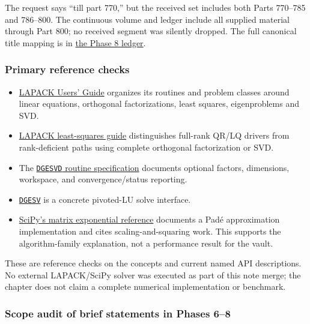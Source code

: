 The request says ``till part 770,'' but the received set includes both Parts 770--785 and 786--800. The continuous volume and ledger include all supplied material through Part 800; no received segment was silently dropped. The full canonical title mapping is in \hyperref[appendix-fd090d982a15-phase-8---parts-701-800]{the Phase 8 ledger}.

\subsubsection{Primary reference checks}\label{appendix-a103e7846d21-primary-reference-checks}

\begin{itemize}
\tightlist
\item
  \href{https://netlib.org/lapack/lug/index.html}{LAPACK Users' Guide} organizes its routines and problem classes around linear equations, orthogonal factorizations, least squares, eigenproblems and SVD.
\item
  \href{https://www.netlib.org/lapack/lug/node27.html}{LAPACK least-squares guide} distinguishes full-rank QR/LQ drivers from rank-deficient paths using complete orthogonal factorization or SVD.
\item
  The \href{https://netlib.org/lapack/explore-html/d1/d7f/group__gesvd_gac6bd5d4e645049e49bb70691180abf07.html}{\texttt{DGESVD} routine specification} documents optional factors, dimensions, workspace, and convergence/status reporting.
\item
  \href{https://netlib.org/lapack/explore-html/d8/da6/group__gesv_ga831ce6a40e7fd16295752d18aed2d541.html}{\texttt{DGESV}} is a concrete pivoted-LU solve interface.
\item
  \href{https://docs.scipy.org/doc/scipy/reference/generated/scipy.sparse.linalg.expm.html}{SciPy's matrix exponential reference} documents a Padé approximation implementation and cites scaling-and-squaring work. This supports the algorithm-family explanation, not a performance result for the vault.
\end{itemize}

These are reference checks on the concepts and current named API descriptions. No external LAPACK/SciPy solver was executed as part of this note merge; the chapter does not claim a complete numerical implementation or benchmark.

\subsubsection{Scope audit of brief statements in Phases 6--8}\label{appendix-a103e7846d21-scope-audit-of-brief-statements-in-phases-68}

